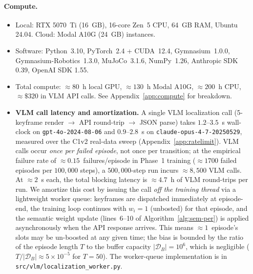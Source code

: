 \paragraph{Compute.}
\begin{itemize}\itemsep0pt
\item Local: RTX 5070~Ti (16~GB), 16-core Zen~5 CPU, 64~GB RAM, Ubuntu
24.04. Cloud: Modal A10G (24~GB) instances.
\item Software: Python~3.10, PyTorch~2.4 + CUDA~12.4,
Gymnasium~1.0.0, Gymnasium-Robotics~1.3.0, MuJoCo~3.1.6,
NumPy~1.26, Anthropic SDK 0.39, OpenAI SDK 1.55.
\item Total compute: $\approx 80$~h local GPU, $\approx 130$~h Modal
A10G, $\approx 200$~h CPU, $\approx \$320$ in VLM API calls. See
Appendix~\ref{app:compute} for breakdown.
\item \textbf{VLM call latency and amortization.}
A single VLM localization call (5-keyframe render $\to$ API
round-trip $\to$ JSON parse) takes $1.2$--$3.5$~s wall-clock on
\texttt{gpt-4o-2024-08-06} and $0.9$--$2.8$~s on
\texttt{claude-opus-4-7-20250529}, measured over the C1v2 real-data
sweep (Appendix~\ref{app:ratelimit}). VLM calls occur \emph{once per
failed episode}, not once per transition; at the empirical failure
rate of $\approx 0.15$~failures/episode in Phase~1 training
($\approx\!1700$ failed episodes per $100{,}000$ steps), a $500{,}000$-step
run incurs $\approx\!8{,}500$ VLM calls. At $\approx\!2$~s each, the
total blocking latency is $\approx\!4.7$~h of VLM round-trips per
run. We amortize this cost by issuing the call
\emph{off the training thread} via a lightweight worker queue:
keyframes are dispatched immediately at episode-end, the training loop
continues with $w_i\!=\!1$ (unbosted) for that episode, and the
semantic weight update (lines~6--10 of Algorithm~\ref{alg:sem-per})
is applied asynchronously when the API response arrives. This means
$\approx\!1$~episode's slots may be un-boosted at any given time; the
bias is bounded by the ratio of the episode length $T$ to the buffer
capacity $|\mathcal{D}_B|\!=\!10^6$, which is negligible
($T/|\mathcal{D}_B|\!\approx\!5\!\times\!10^{-5}$ for $T\!=\!50$).
The worker-queue implementation is in
\texttt{src/vlm/localization\_worker.py}.
\end{itemize}

